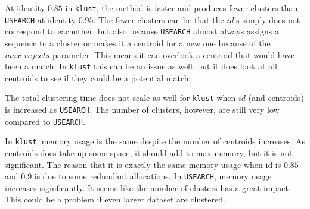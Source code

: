 At identity $0.85$ in \texttt{klust}, the method is faster and produces fewer
clusters than \texttt{USEARCH} at identity $0.95$. The fewer clusters can be
that the $id$'s simply does not correspond to eachother, but also because
\texttt{USEARCH} almost always assigns a sequence to a cluster or makes it a
centroid for a new one because of the $max\_rejects$ parameter. This means it
can overlook a centroid that would have been a match. In \texttt{klust} this
can be an issue as well, but it does look at all centroids to see if they
could be a potential match.

The total clustering time does not scale as well for \texttt{klust} when $id$
(and centroids) is increased as \texttt{USEARCH}. The number of clusters,
however, are still very low compared to \texttt{USEARCH}.

In \texttt{klust}, memory usage is the same despite the number of centroids
increases. As centroids does take up some space, it should add to max memory,
but it is not significant. The reason that it is exactly the same memory usage
when id is $0.85$ and $0.9$ is due to some redundant allocations. In \texttt{USEARCH}, memory usage increases significantly. It seems like
the number of clusters has a great impact. This could be a problem if even
larger dataset are clustered.